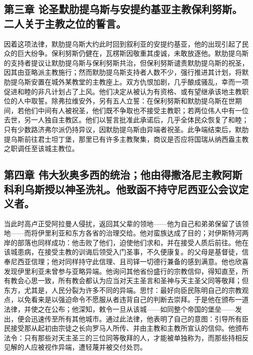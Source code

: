 \subsection{第三章 论圣默肋提乌斯与安提约基亚主教保利努斯。二人关于主教之位的誓言。}

因着这项法律，默肋提乌斯大约此时回到叙利亚的安提约基亚，他的出现引起了民众的巨大纷争。保利努斯仍健在，瓦楞斯因敬重其虔诚，未敢放逐他。默肋提乌斯的支持者提议让默肋提乌斯与保利努斯共治，但保利努斯谴责默肋提乌斯的祝圣，因其由亚略派主教施行；然而默肋提乌斯支持者人数不少，强行推进其计划，将默肋提乌斯安置在城外某教堂的主教座上。双方仇恨加剧，几乎酿成骚乱，幸而一项促进和睦的非凡计划占了上风。他们决定从被认为有资格、或有望继承该地主教职位的人中取誓。除弗拉维安外，另有五人立誓：在保利努斯和默肋提乌斯在世期间，若他们中间有人被祝圣，他们既不争取也不接受主教职；若两位伟人中有一位去世，另一人独自主教区。他们以誓言批准此承诺后，几乎全体民众恢复了和睦；只有少数路济弗尔派仍持异议，因默肋提乌斯由异端者祝圣。此争端结束后，默肋提乌斯前往君士坦丁堡，那里已有许多主教聚集，商议是否应将国瑞从纳西盎主教之职调任至该城主教位。\par


\subsection{第四章 伟大狄奥多西的统治；他由得撒洛尼主教阿斯科利乌斯授以神圣洗礼。他致函不持守尼西亚公会议定义者。}

当此时高卢正受阿拉曼人侵扰，返回其父辈的领地——他为自己和弟弟保留了该领地——而将伊里利亚和东方各省的治理交给。他对蛮族达成了目的；对伊斯特河两岸的部落也同样成功：他击败了他们，迫使他们求和，并在接受人质后前往。他在该城患病，在接受主教的训诲后领受入门圣事，不久便康复。的父母是基督徒，信奉尼西亚信理；他对同样持守此信理、且司铎一切德行兼备的感到满意。他也欣喜发现伊里利亚未曾参与亚略异端。他询问其他省份盛行的宗教信仰，得知直至，所有教会心思一致，所有教会都认为应当对天主圣言和圣神与天主圣父同等敬拜；但东方，尤其是，人民分裂为许多不同的异端。思忖：最好向臣民陈明自己的宗教观点，以免看来是以强迫命令不愿服从者违背自己的判断去崇拜。于是他在颁布一道法律，并使之在公布；他深知，敕令一旦从该城——如同整个帝国的堡垒——发出，便会迅速传至所有其他城市。通过此法律，他表明了自己的意图：引导所有臣民接受那从起初由宗徒之长向罗马人所传、并由主教和主教所宣认的信仰。他颁布法令：只有那些对天主圣三的三位同等敬拜的人，才能被单独称为，而那些持相反见解的人应被视作异端，遭轻蔑并被交付处罚。\par

